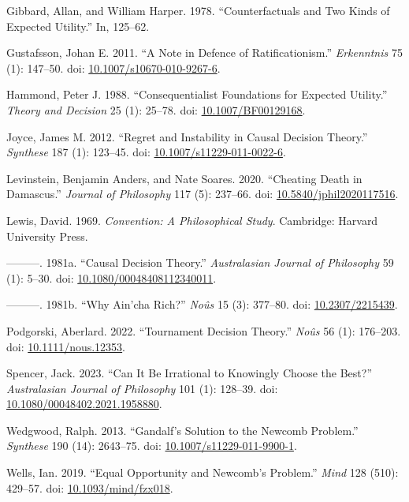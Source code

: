\documentclass[
  10pt,
  letterpaper,
  DIV=11,
  numbers=noendperiod,
  twoside]{scrartcl}
\newlength{\cslhangindent}
\newenvironment{CSLReferences}[2] %
 {\begin{list}{}{%
  \setlength{\itemindent}{0pt}
  \setlength{\leftmargin}{0pt}
  \setlength{\parsep}{0pt}
  \ifodd #1
   \setlength{\leftmargin}{\cslhangindent}
   \setlength{\itemindent}{-1\cslhangindent}
  \fi
  \setlength{\itemsep}{#2\baselineskip}}}
 {\end{list}}
\begin{document}
\begin{CSLReferences}{1}{0}
Gibbard, Allan, and William Harper. 1978. {``Counterfactuals and Two
Kinds of Expected Utility.''} In, 125--62.

Gustafsson, Johan E. 2011. {``A Note in Defence of Ratificationism.''}
\emph{Erkenntnis} 75 (1): 147--50. doi:
\href{https://doi.org/10.1007/s10670-010-9267-6}{10.1007/s10670-010-9267-6}.

Hammond, Peter J. 1988. {``Consequentialist Foundations for Expected
Utility.''} \emph{Theory and Decision} 25 (1): 25--78. doi:
\href{https://doi.org/10.1007/BF00129168}{10.1007/BF00129168}.

Joyce, James M. 2012. {``Regret and Instability in Causal Decision
Theory.''} \emph{Synthese} 187 (1): 123--45. doi:
\href{https://doi.org/10.1007/s11229-011-0022-6}{10.1007/s11229-011-0022-6}.

Levinstein, Benjamin Anders, and Nate Soares. 2020. {``Cheating Death in
Damascus.''} \emph{Journal of Philosophy} 117 (5): 237--66. doi:
\href{https://doi.org/10.5840/jphil2020117516}{10.5840/jphil2020117516}.

Lewis, David. 1969. \emph{Convention: A Philosophical Study}. Cambridge:
Harvard University Press.

---------. 1981a. {``Causal Decision Theory.''} \emph{Australasian
Journal of Philosophy} 59 (1): 5--30. doi:
\href{https://doi.org/10.1080/00048408112340011}{10.1080/00048408112340011}.

---------. 1981b. {``Why Ain'cha Rich?''} \emph{No{û}s} 15 (3): 377--80.
doi: \href{https://doi.org/10.2307/2215439}{10.2307/2215439}.

Podgorski, Aberlard. 2022. {``Tournament Decision Theory.''}
\emph{No{û}s} 56 (1): 176--203. doi:
\href{https://doi.org/10.1111/nous.12353}{10.1111/nous.12353}.

Spencer, Jack. 2023. {``Can It Be Irrational to Knowingly Choose the
Best?''} \emph{Australasian Journal of Philosophy} 101 (1): 128--39.
doi:
\href{https://doi.org/10.1080/00048402.2021.1958880}{10.1080/00048402.2021.1958880}.

Wedgwood, Ralph. 2013. {``Gandalf's Solution to the Newcomb Problem.''}
\emph{Synthese} 190 (14): 2643--75. doi:
\href{https://doi.org/10.1007/s11229-011-9900-1}{10.1007/s11229-011-9900-1}.

Wells, Ian. 2019. {``Equal Opportunity and Newcomb's Problem.''}
\emph{Mind} 128 (510): 429--57. doi:
\href{https://doi.org/10.1093/mind/fzx018}{10.1093/mind/fzx018}.

\end{CSLReferences}
\end{document}
